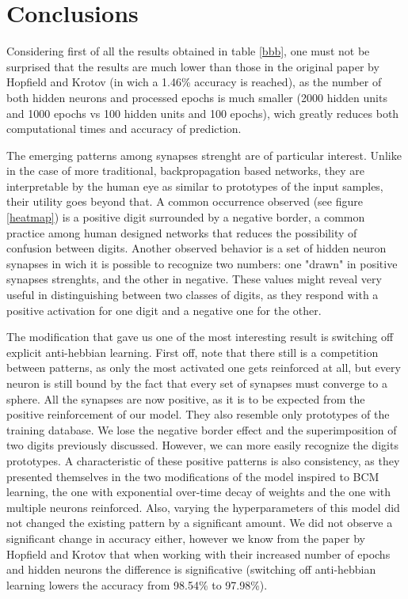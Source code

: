 \documentclass[a4paper]{report}
\begin{document}
\chapter{Conclusions}

Considering first of all the results obtained in table \ref{bbb}, one must not be surprised that the results are much lower than those in the original paper by Hopfield and Krotov (in wich a 1.46\% accuracy is reached), as the number of both hidden neurons and processed epochs is much smaller (2000 hidden units and 1000 epochs vs 100 hidden units and 100 epochs), wich greatly reduces both computational times and accuracy of prediction.

The emerging patterns among synapses strenght are of particular interest. Unlike in the case of more traditional, backpropagation based networks, they are interpretable by the human eye as similar to prototypes of the input samples, their utility goes beyond that. A common occurrence observed (see figure \ref{heatmap}) is a positive digit surrounded by a negative border, a common practice among human designed networks that reduces the possibility of confusion between digits. Another observed behavior is a set of hidden neuron synapses in wich it is possible to recognize two numbers: one "drawn" in positive synapses strenghts, and the other in negative. These values might reveal very useful in distinguishing between two classes of digits, as they respond with a positive activation for one digit and a negative one for the other.

The modification that gave us one of the most interesting result is switching off explicit anti-hebbian learning. First off, note that there still is a competition between patterns, as only the most activated one gets reinforced at all, but every neuron is still bound by the fact that every set of synapses must converge to a sphere. All the synapses are now positive, as it is to be expected from the positive reinforcement of our model. They also resemble only prototypes of the training database. We lose the negative border effect and the superimposition of two digits previously discussed. However, we can more easily recognize the digits prototypes.  A characteristic of these positive patterns is also consistency, as they presented themselves in the two modifications of the model inspired to BCM learning, the one with exponential over-time decay of weights and the one with multiple neurons reinforced. Also, varying the hyperparameters of this model did not changed the existing pattern by a significant amount. We did not observe a significant change in accuracy either, however we know from the paper by Hopfield and Krotov that when working with their increased number of epochs and hidden neurons the difference is significative (switching off anti-hebbian learning lowers the accuracy from 98.54\% to 97.98\%).
\end{document}

